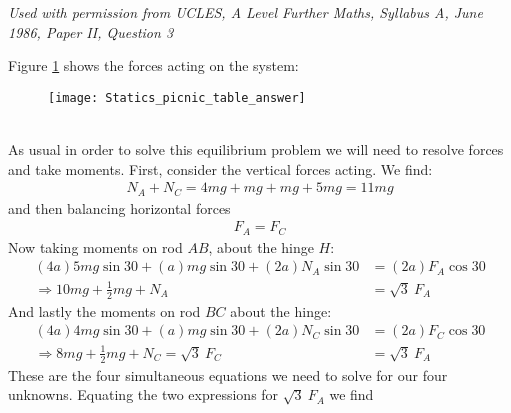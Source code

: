 \begin{problem}[A1986FMIIQ3l]
{
}
{\textit{Used with permission from UCLES, A Level Further Maths, Syllabus A, June 1986, Paper II, Question 3}}
{
Figure \ref{fig:Statics_picnic_table_answer} shows the forces acting on the system:
\begin{figure}[h]
\centering
\texttt{[image: Statics\_picnic\_table\_answer]}
\caption{}
\label{fig:Statics_picnic_table_answer}
\end{figure}
\\
As usual in order to solve this equilibrium problem we will need to resolve forces and take moments. First, consider the vertical forces acting. We find:
\begin{align*}
N_A+N_C=4mg+mg+mg+5mg=11mg
\end{align*}
and then balancing horizontal forces
\begin{align*}
F_A=F_C
\end{align*}
Now taking moments on rod $AB$, about the hinge $H$:
\begin{align*}
(4a)5mg\sin{30}+(a)mg\sin{30}+(2a)N_A\sin{30}&=(2a)F_A\cos{30} \\
\Rightarrow 10mg+\frac{1}{2}mg+N_A&=\sqrt 3\: F_A
\end{align*}
And lastly the moments on rod $BC$ about the hinge:
\begin{align*}
(4a)4mg\sin{30}+(a)mg\sin{30}+(2a)N_C\sin{30}&=(2a)F_C\cos{30} \\
\Rightarrow 8mg+\frac{1}{2}mg+N_C=\sqrt 3 \: F_C&=\sqrt 3\: F_A
\end{align*}
These are the four simultaneous equations we need to solve for our four unknowns. Equating the two expressions for $\sqrt 3 \: F_A$ we find
}
\end{problem}

